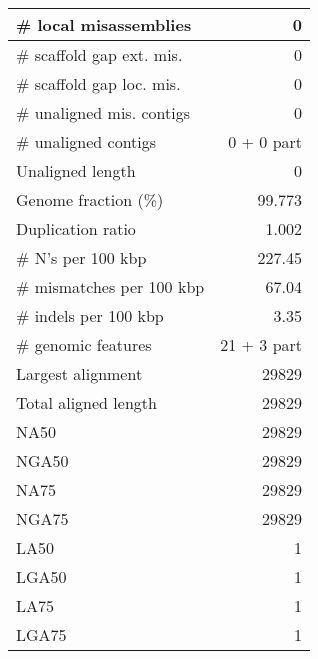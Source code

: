 \documentclass[12pt,a4paper]{article}
\begin{document}
\begin{table}[ht]
\begin{center}
\begin{tabular}{|l*{1}{|r}|}
\# local misassemblies & 0 \\ \hline
\# scaffold gap ext. mis. & 0 \\ \hline
\# scaffold gap loc. mis. & 0 \\ \hline
\# unaligned mis. contigs & 0 \\ \hline
\# unaligned contigs & 0 + 0 part \\ \hline
Unaligned length & 0 \\ \hline
Genome fraction (\%) & 99.773 \\ \hline
Duplication ratio & 1.002 \\ \hline
\# N's per 100 kbp & 227.45 \\ \hline
\# mismatches per 100 kbp & 67.04 \\ \hline
\# indels per 100 kbp & 3.35 \\ \hline
\# genomic features & 21 + 3 part \\ \hline
Largest alignment & 29829 \\ \hline
Total aligned length & 29829 \\ \hline
NA50 & 29829 \\ \hline
NGA50 & 29829 \\ \hline
NA75 & 29829 \\ \hline
NGA75 & 29829 \\ \hline
LA50 & 1 \\ \hline
LGA50 & 1 \\ \hline
LA75 & 1 \\ \hline
LGA75 & 1 \\ \hline
\end{tabular}
\end{center}
\end{table}
\end{document}
